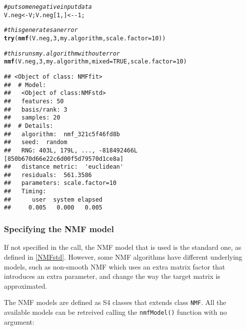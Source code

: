 \documentclass[a4paper]{article}\usepackage[]{graphicx}\usepackage[]{color}
\makeatletter
\newcommand{\hlnum}[1]{\textcolor[rgb]{0.686,0.059,0.569}{#1}}%
\newcommand{\hlcom}[1]{\textcolor[rgb]{0.678,0.584,0.686}{\textit{#1}}}%
\newcommand{\hlopt}[1]{\textcolor[rgb]{0,0,0}{#1}}%
\newcommand{\hlstd}[1]{\textcolor[rgb]{0.345,0.345,0.345}{#1}}%
\newcommand{\hlkwb}[1]{\textcolor[rgb]{0.69,0.353,0.396}{#1}}%
\newcommand{\hlkwc}[1]{\textcolor[rgb]{0.333,0.667,0.333}{#1}}%
\newcommand{\hlkwd}[1]{\textcolor[rgb]{0.737,0.353,0.396}{\textbf{#1}}}%
\newenvironment{kframe}{%
 \def\at@end@of@kframe{}%
 \ifinner\ifhmode%
  \def\at@end@of@kframe{\end{minipage}}%
  \begin{minipage}{\columnwidth}%
 \fi\fi%
 \def\FrameCommand##1{\hskip\@totalleftmargin \hskip-\fboxsep
 \colorbox{shadecolor}{##1}\hskip-\fboxsep
     \hskip-\linewidth \hskip-\@totalleftmargin \hskip\columnwidth}%
 \MakeFramed {\advance\hsize-\width
   \@totalleftmargin\z@ \linewidth\hsize
   \@setminipage}}%
 {\par\unskip\endMakeFramed%
 \at@end@of@kframe}
\newenvironment{knitrout}{}{} %
\let\code=\texttt
\renewcommand{\cite}[1]{\parencite{#1}}
\makeatother
\begin{document}
\begin{knitrout}
\color{fgcolor}\begin{kframe}
\begin{alltt}
\hlcom{# put some negative input data }
\hlstd{V.neg} \hlkwb{<-} \hlstd{V; V.neg[}\hlnum{1}\hlstd{,]} \hlkwb{<-} \hlopt{-}\hlnum{1}\hlstd{;}

\hlcom{# this generates an error}
\hlkwd{try}\hlstd{(} \hlkwd{nmf}\hlstd{(V.neg,} \hlnum{3}\hlstd{, my.algorithm,} \hlkwc{scale.factor}\hlstd{=}\hlnum{10}\hlstd{) )}
\end{alltt}


{\ttfamily\noindent\bfseries\color{errorcolor}{\#\# Error: NMF::nmf - Input matrix x contains some negative entries.}}\begin{alltt}
\hlcom{# this runs my.algorithm without error}
\hlkwd{nmf}\hlstd{(V.neg,} \hlnum{3}\hlstd{, my.algorithm,} \hlkwc{mixed}\hlstd{=}\hlnum{TRUE}\hlstd{,} \hlkwc{scale.factor}\hlstd{=}\hlnum{10}\hlstd{)}
\end{alltt}
\begin{verbatim}
## <Object of class: NMFfit>
##  # Model:
##   <Object of class:NMFstd>
##   features: 50 
##   basis/rank: 3 
##   samples: 20 
##  # Details:
##   algorithm:  nmf_321c5f46fd8b 
##   seed:  random 
##   RNG: 403L, 179L, ..., -818492466L [850b670d66e22c6d00f5d79570d1ce8a]
##   distance metric:  'euclidean' 
##   residuals:  561.3586 
##   parameters: scale.factor=10 
##   Timing:
##      user  system elapsed 
##     0.005   0.000   0.005
\end{verbatim}
\end{kframe}
\end{knitrout}

\subsubsection{Specifying the NMF model}
If not specified in the call, the NMF model that is used is the standard one, as defined in \cref{NMFstd}. 
However, some NMF algorithms have different underlying models, such as non-smooth NMF \cite{Pascual-Montano2006} which uses an extra matrix factor that introduces an extra parameter, and change the way the target matrix is approximated.

The NMF models are defined as S4 classes that extends class \code{NMF}. All the available models can be retreived calling the \code{nmfModel()} function with no 
argument:
\end{document}
